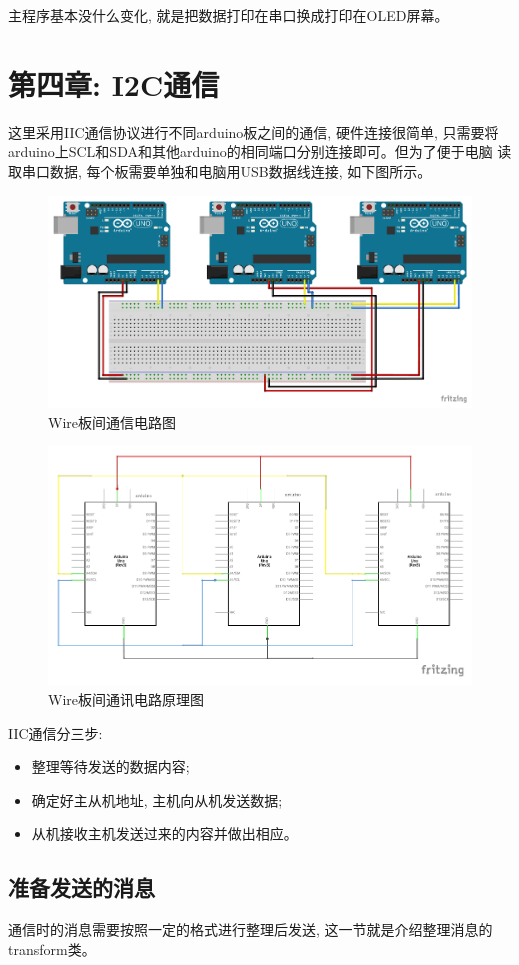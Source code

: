 \documentclass{article}
\begin{document}
主程序基本没什么变化, 就是把数据打印在串口换成打印在OLED屏幕。

\section{第四章: I2C通信}
这里采用IIC通信协议进行不同arduino板之间的通信, 硬件连接很简单, 只需要将arduino上SCL和SDA和其他arduino的相同端口分别连接即可。但为了便于电脑
读取串口数据, 每个板需要单独和电脑用USB数据线连接, 如下图所示。
\begin{figure}[h]
    \centering
    \includegraphics[width=0.6\linewidth]{../4_Chapter4_COMMUNICATION/picture/I2C_.pdf}
    \caption{Wire板间通信电路图}
    \label{fig:Wire板间通信电路图}
\end{figure}

\begin{figure}[h]
     \centering
     \includegraphics[width=0.6\linewidth]{../4_Chapter4_COMMUNICATION/picture/I2C_line.pdf}
     \caption{Wire板间通讯电路原理图}
     \label{fig:Wire板间通讯电路原理图}
\end{figure}

IIC通信分三步:
\begin{itemize}
    \item 整理等待发送的数据内容;
    \item 确定好主从机地址, 主机向从机发送数据;
    \item 从机接收主机发送过来的内容并做出相应。
\end{itemize}

\subsection{准备发送的消息}
通信时的消息需要按照一定的格式进行整理后发送, 这一节就是介绍整理消息的transform类。
\end{document}
